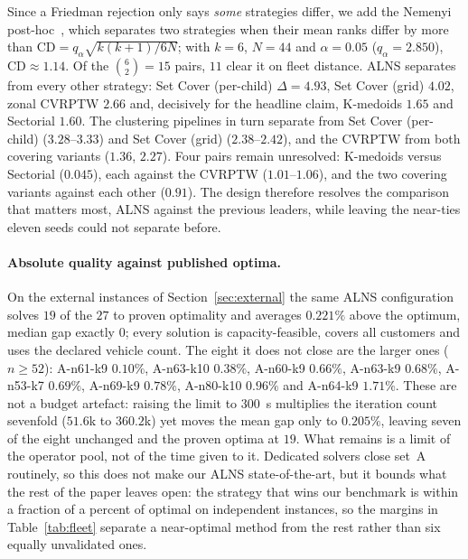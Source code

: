 \documentclass[graybox]{SNmult}
\begin{document}
Since a Friedman rejection only says \emph{some} strategies differ, we add
the Nemenyi post-hoc~\cite{Demsar2006Statistical}, which separates two
strategies when their mean ranks differ by more than
$\mathrm{CD}=q_\alpha\sqrt{k(k+1)/6N}$; with $k=6$, $N=44$ and
$\alpha=0.05$ ($q_\alpha=2.850$), $\mathrm{CD}\approx1.14$. Of the
$\binom{6}{2}=15$ pairs, $11$ clear it on fleet distance. ALNS separates
from every other strategy: Set Cover (per-child) $\Delta=4.93$, Set
Cover (grid) $4.02$, zonal CVRPTW $2.66$ and, decisively for the headline
claim, K-medoids $1.65$ and Sectorial $1.60$. The clustering pipelines in
turn separate from Set Cover (per-child) ($3.28$--$3.33$) and Set Cover
(grid) ($2.38$--$2.42$), and the CVRPTW from both covering variants
($1.36$, $2.27$). Four pairs remain unresolved: K-medoids versus Sectorial
($0.045$), each against the CVRPTW ($1.01$--$1.06$), and the two covering
variants against each other ($0.91$). The design therefore resolves the
comparison that matters most, ALNS against the previous leaders, while
leaving the near-ties eleven seeds could not separate before.

\paragraph{Absolute quality against published optima.}
On the external instances of Section~\ref{sec:external} the same ALNS
configuration solves $19$ of the $27$ to proven optimality and averages
$0.221\%$ above the optimum, median gap exactly $0$; every solution is
capacity-feasible, covers all customers and uses the declared vehicle
count. The eight it does not close are the larger ones ($n\ge52$):
A-n61-k9 $0.10\%$, A-n63-k10 $0.38\%$, A-n60-k9 $0.66\%$, A-n63-k9
$0.68\%$, A-n53-k7 $0.69\%$, A-n69-k9 $0.78\%$, A-n80-k10 $0.96\%$ and
A-n64-k9 $1.71\%$. These are not a budget artefact: raising the limit to
$300$~s multiplies the iteration count sevenfold ($51.6$k to $360.2$k) yet
moves the mean gap only to $0.205\%$, leaving seven of the eight unchanged
and the proven optima at $19$. What remains is a limit of the operator
pool, not of the time given to it. Dedicated solvers close set~A routinely, so this does
not make our ALNS state-of-the-art, but it bounds what the rest of the
paper leaves open: the strategy that wins our benchmark is within a
fraction of a percent of optimal on independent instances, so the margins
in Table~\ref{tab:fleet} separate a near-optimal method from the rest
rather than six equally unvalidated ones.
\end{document}
